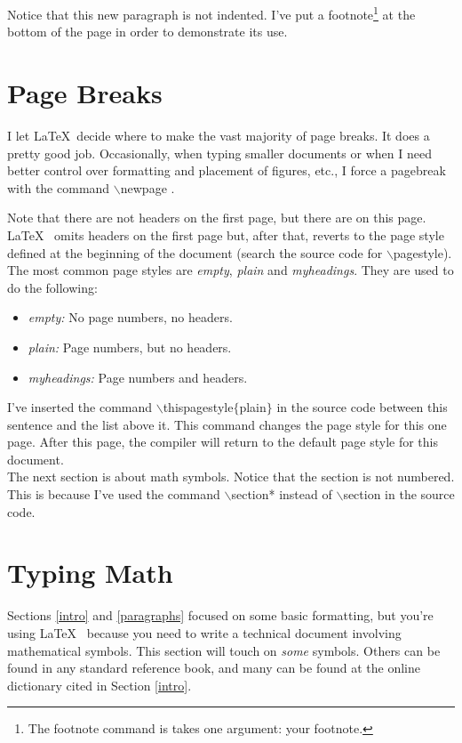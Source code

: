 \documentclass[12pt]{report} %
\newcommand{\bi}{\begin{itemize}}		%
\newcommand{\ei}{\end{itemize}}		%
\begin{document}
Notice that this new paragraph is not indented.  I've put a footnote\footnote{The 
footnote command is takes one argument: your footnote.} at the bottom of the page 
in order to demonstrate its use.

\setcounter{chapter}{3}
\section{Page Breaks}

I let \LaTeX ~decide where to make the vast majority of page breaks.  It does a 
pretty good job.  Occasionally, when typing smaller documents or when I need 
better control over formatting and placement of figures, etc., I force a pagebreak 
with the command $\backslash$newpage . 

Note that there are not headers on the first page, but there are on this page.  \LaTeX~ 
omits headers on the first page but, after that, reverts to the page style defined at 
the beginning of the document (search the source code for $\backslash$pagestyle).  
The most common page styles are {\it empty}, {\it plain} and {\it myheadings}.  They 
are used to do the following:
	\bi
	\item[\it empty:] No page numbers, no headers.
	\item[\it plain:] Page numbers, but no headers.
	\item[\it myheadings:] Page numbers and headers.
	\ei

\thispagestyle{plain}
I've inserted the command $\backslash$thispagestyle$\{$plain$\}$ in the source 
code between this sentence and the list above it.  This command changes the page 
style for this one page.  After this page, the compiler will return to the default page 
style for this document.\\

The next section is about math symbols.  Notice that the section is not numbered.  
This is because I've used the command $\backslash$section* instead of 
$\backslash$section in the source code.\\
\begin{center}
\end{center}

\newpage

\setcounter{chapter}{4}
\section*{Typing Math}
\label{math}
Sections \ref{intro} and \ref{paragraphs} focused on some basic formatting, but 
you're using \LaTeX~ because you need to write a technical document involving
mathematical symbols.  This section will touch on {\it some} symbols.  Others can 
be found in any standard reference book, and many can be found at the online 
dictionary cited in Section \ref{intro}.  
\end{document}

